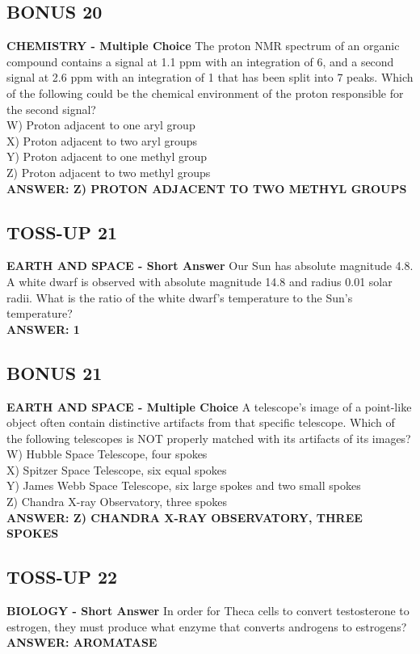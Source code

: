 \documentclass{article}
\begin{document}
\subsection*{BONUS 20}
\textbf{CHEMISTRY - Multiple Choice} The proton NMR spectrum of an organic compound contains a signal at 1.1 ppm with an integration of 6, and a second signal at 2.6 ppm with an integration of 1 that has been split into 7 peaks. Which of the following could be the chemical environment of the proton responsible for the second signal? \\
W) Proton adjacent to one aryl group \\
X) Proton adjacent to two aryl groups \\
Y) Proton adjacent to one methyl group \\
Z) Proton adjacent to two methyl groups \\
\textbf{ANSWER: Z) PROTON ADJACENT TO TWO METHYL GROUPS}

\subsection*{TOSS-UP 21}
\textbf{EARTH AND SPACE - Short Answer} Our Sun has absolute magnitude 4.8. A white dwarf is observed with absolute magnitude 14.8 and radius 0.01 solar radii. What is the ratio of the white dwarf's temperature to the Sun's temperature? \\
\textbf{ANSWER: 1}

\subsection*{BONUS 21}
\textbf{EARTH AND SPACE - Multiple Choice} A telescope's image of a point-like object often contain distinctive artifacts from that specific telescope. Which of the following telescopes is NOT properly matched with its artifacts of its images? \\
W) Hubble Space Telescope, four spokes \\
X) Spitzer Space Telescope, six equal spokes \\
Y) James Webb Space Telescope, six large spokes and two small spokes \\
Z) Chandra X-ray Observatory, three spokes \\
\textbf{ANSWER: Z) CHANDRA X-RAY OBSERVATORY, THREE SPOKES}

\subsection*{TOSS-UP 22}
\textbf{BIOLOGY - Short Answer} In order for Theca cells to convert testosterone to estrogen, they must produce what enzyme that converts androgens to estrogens? \\
\textbf{ANSWER: AROMATASE}
\end{document}
